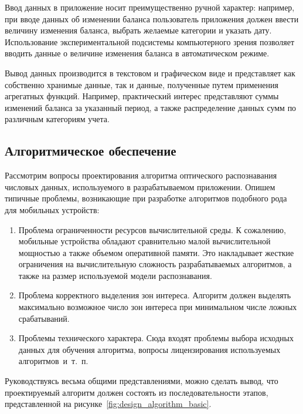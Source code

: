 Ввод данных в приложение носит преимущественно ручной характер:
например, при вводе данных об изменении баланса
пользователь приложения должен ввести величину изменения баланса,
выбрать желаемые категории и указать дату.
Использование экспериментальной подсистемы компьютерного зрения
позволяет вводить данные о величине изменения баланса в
автоматическом режиме.

Вывод данных производится в текстовом и графическом виде и
представляет как собственно хранимые данные, так и данные, полученные путем
применения агрегатных функций. Например, практический интерес представляют
суммы изменений баланса за указанный период, а также распределение
данных сумм по различным категориям учета.

\subsection{Алгоритмическое обеспечение}
\label{ssec:design_algorithm}

Рассмотрим вопросы проектирования алгоритма оптического
распознавания числовых данных, используемого в разрабатываемом приложении.
Опишем типичные проблемы, возникающие при разработке алгоритмов подобного рода
для мобильных устройств:
\begin{enumerate}
  \item Проблема ограниченности ресурсов вычислительной среды.
    К сожалению, мобильные устройства обладают сравнительно малой вычислительной
    мощностью а также объемом оперативной памяти.
    Это накладывает жесткие ограничения на вычислительную сложность
    разрабатываемых алгоритмов, а также на размер используемой модели распознавания.
  \item Проблема корректного выделения зон интереса.
    Алгоритм должен выделять максимально возможное число зон интереса
    при минимальном числе ложных срабатываний.
  \item Проблемы технического характера. Сюда входят проблемы выбора исходных данных для
    обучения алгоритма, вопросы лицензирования используемых алгоритмов~и~т.~п.
\end{enumerate}

Руководствуясь весьма общими представлениями, можно сделать вывод,
что проектируемый алгоритм должен состоять из последовательности этапов,
представленной на рисунке~\ref{fig:design_algorithm_basic}.

